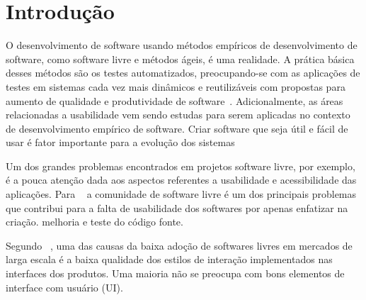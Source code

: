 \chapter{Introdução}

O desenvolvimento de software usando métodos empíricos de desenvolvimento de software, como software livre e métodos ágeis, é uma realidade.
%
A prática básica desses métodos são os testes automatizados, preocupando-se com as aplicações de testes em sistemas cada vez mais dinâmicos e reutilizáveis com propostas para aumento de qualidade e produtividade de software~\cite{vicente2010}.
%
Adicionalmente, as áreas relacionadas a usabilidade vem sendo estudas para serem aplicadas no contexto de desenvolvimento empírico de software. Criar software que seja útil e fácil de usar é fator importante para a evolução dos sistemas ~\cite{santos2012}


Um dos grandes problemas encontrados em projetos software livre, por exemplo, é a pouca atenção dada aos aspectos referentes a usabilidade e acessibilidade das aplicações. Para ~ a comunidade de software livre é um dos principais problemas que contribui para a falta de usabilidade dos softwares por apenas enfatizar na criação. melhoria e teste do código fonte.

%
Segundo ~, uma das causas da baixa adoção de softwares livres em mercados de larga escala é a baixa qualidade dos estilos de interação implementados nas interfaces dos produtos. Uma maioria não se preocupa com bons elementos de interface com usuário (UI). 

